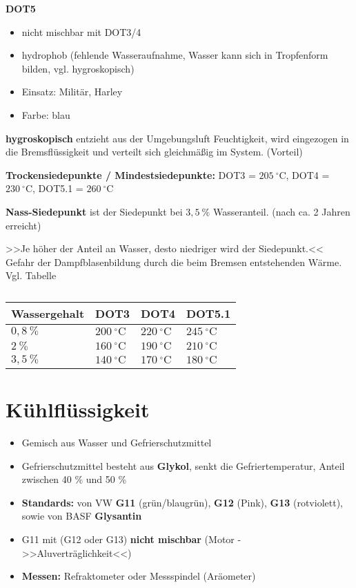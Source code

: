 \textbf{DOT5}

\begin{itemize}
\item
  nicht mischbar mit DOT3/4
\item
  hydrophob (fehlende Wasseraufnahme, Wasser kann sich in Tropfenform
  bilden, vgl. hygroskopisch)
\item
  Einsatz: Militär, Harley
\item
  Farbe: blau
\end{itemize}

\textbf{hygroskopisch} entzieht aus der Umgebungsluft Feuchtigkeit, wird
eingezogen in die Bremsflüssigkeit und verteilt sich gleichmäßig im
System. (Vorteil)

\textbf{Trockensiedepunkte / Mindestsiedepunkte:} DOT3 =
$205~^\circ\text{C}$, DOT4 = $230~^\circ\text{C}$, DOT5.1 =
$260~^\circ\text{C}$

\textbf{Nass-Siedepunkt} ist der Siedepunkt bei $3,5~\%$ Wasseranteil.
(nach ca. 2 Jahren erreicht)

>>Je höher der Anteil an Wasser, desto niedriger wird der Siedepunkt.<<
Gefahr der Dampfblasenbildung durch die beim Bremsen entstehenden Wärme.
Vgl. Tabelle

\begin{table}[!ht]%
\centering 
	\caption{}%
\begin{tabular}{@{}llll@{}}
\hline
\textbf{Wassergehalt} & \textbf{DOT3} & \textbf{DOT4} &
\textbf{DOT5.1} \\
\hline
$0,8~\%$ & $200~^\circ\text{C}$ & $220~^\circ\text{C}$ &
$245~^\circ\text{C}$ \\
$2~\%$ & $160~^\circ\text{C}$ & $190~^\circ\text{C}$ &
$210~^\circ\text{C}$ \\
$3,5~\%$ & $140~^\circ\text{C}$ & $170~^\circ\text{C}$ &
$180~^\circ\text{C}$ \\
\hline
\end{tabular} 
\end{table}

\section{Kühlflüssigkeit}\label{kuehlfluessigkeit}

\begin{itemize}
\item
  Gemisch aus Wasser und Gefrierschutzmittel
\item
  Gefrierschutzmittel besteht aus \textbf{Glykol}, senkt die
  Gefriertemperatur, Anteil zwischen 40 \% und 50 \%
\item
  \textbf{Standards:} von VW \textbf{G11} (grün/blaugrün), \textbf{G12}
  (Pink), \textbf{G13} (rotviolett), sowie von BASF \textbf{Glysantin}
\item
  G11 mit (G12 oder G13) \textbf{nicht mischbar} (Motor -
  >>Aluverträglichkeit<<)
\item
  \textbf{Messen:} Refraktometer oder Messspindel (Aräometer)
\end{itemize}

